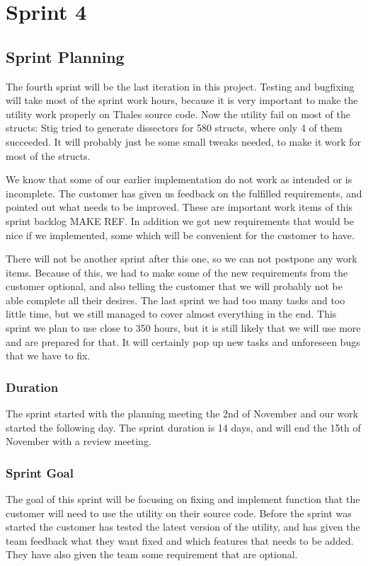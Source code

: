 \chapter{Sprint 4}


\section{Sprint Planning}
The fourth sprint will be the last iteration in this project. Testing and bugfixing will take most of the sprint work hours, because it is very important to make the utility work properly on Thales source code. Now the utility fail on most of the structs: Stig tried to generate dissectors for 580 structs, where only 4 of them succeeded. It will probably just be some small tweaks needed, to make it work for most of the structs.

We know that some of our earlier implementation do not work as intended or is incomplete. The customer has given us feedback on the fulfilled requirements, and pointed out what needs to be improved. These are important work items of this sprint backlog MAKE REF. In addition we got new requirements that would be nice if we implemented, some which will be convenient for the customer to have. 

There will not be another sprint after this one, so we can not postpone any work items. Because of this, we had to make some of the new requirements from the customer optional, and also telling the customer that we will probably not be able complete all their desires. The last sprint we had too many tasks and too little time, but we still managed to cover almost everything in the end. This sprint we plan to use close to 350 hours, but it is still likely that we will use more and are prepared for that. It will certainly pop up new tasks and unforeseen bugs that we have to fix.

\subsection{Duration}
The sprint started with the planning meeting the 2nd of November and our work started the following day. The sprint duration is 14 days, and will end the 15th of November with a review meeting. 

\subsection{Sprint Goal}
The goal of this sprint will be focusing on fixing and implement function that the customer will need to use the utility on their source code. Before the sprint was started the customer has tested the latest version of the utility, and has given the team feedback what they want fixed and which features that needs to be added. They have also given the team some requirement that are optional. 

